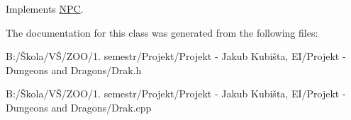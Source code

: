 Implements \hyperlink{class_n_p_c_a3987735754198ab346e6dc09a5d24bbf}{N\-P\-C}.



The documentation for this class was generated from the following files\-:\begin{DoxyCompactItemize}
\item 
B\-:/Škola/\-VŠ/\-Z\-O\-O/1. semestr/\-Projekt/\-Projekt -\/ Jakub Kubišta, E\-I/\-Projekt -\/ Dungeons and Dragons/Drak.\-h\item 
B\-:/Škola/\-VŠ/\-Z\-O\-O/1. semestr/\-Projekt/\-Projekt -\/ Jakub Kubišta, E\-I/\-Projekt -\/ Dungeons and Dragons/Drak.\-cpp\end{DoxyCompactItemize}
